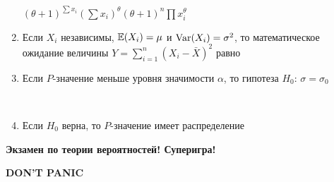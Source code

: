 \documentclass[12pt, a4paper]{article}\usepackage[]{graphicx}\usepackage[]{color}
\begin{document}
\begin{enumerate}
{$(\theta+1)^{\sum x_i}$}{$(\sum x_i)^{\theta}$}{$(\theta+1)^n\prod x_i^{\theta}$}

\item Если $X_i$ независимы, $\mathbb{E}(X_i)=\mu$ и $\operatorname{Var}(X_i)=\sigma^2$, то математическое ожидание величины $Y=\sum_{i=1}^{n}(X_i-\bar{X})^2$ равно


\item Если $P$-значение меньше уровня значимости $\alpha$, то гипотеза $H_0$: $\sigma=\sigma_0$

 \\

\item Если $H_0$ верна, то $P$-значение имеет распределение



\end{enumerate}




\textbf{Экзамен по теории вероятностей! Суперигра!}

\vspace{20pt}
\begin{center}
\textbf{DON'T PANIC}
\end{center}
\vspace{20pt}
\end{document}
